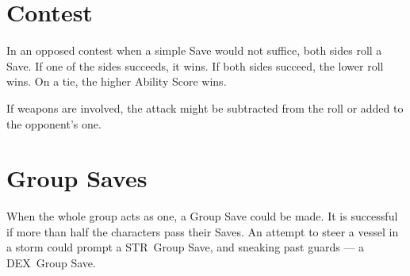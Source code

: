 \documentclass[itdr/core]{subfiles}
\begin{document}
\section{Contest}
In an opposed contest when a simple Save would not suffice, both sides roll a Save. If one of the sides succeeds, it wins. If both sides succeed, the lower roll wins. On a tie, the higher Ability Score wins.

If weapons are involved, the attack might be subtracted from the roll or added to the opponent's one.

\vfill

\section{Group Saves}
When the whole group acts as one, a Group Save could be made. It is successful if more than half the characters pass their Saves. An attempt to steer a vessel in a storm could prompt a STR~Group Save, and sneaking past guards --- a DEX~Group Save.

\vfill

\end{document}
